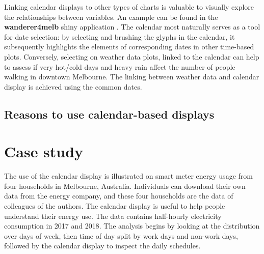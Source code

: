 \documentclass[12pt]{article}
\begin{document}
Linking calendar displays to other types of charts is valuable to
visually explore the relationships between variables. An example can be
found in the \textbf{wanderer4melb} shiny application
\citep{R-wanderer4melb}. The calendar most naturally serves as a tool
for date selection: by selecting and brushing the glyphs in the
calendar, it subsequently highlights the elements of corresponding dates
in other time-based plots. Conversely, selecting on weather data plots,
linked to the calendar can help to assess if very hot/cold days and
heavy rain affect the number of people walking in downtown Melbourne.
The linking between weather data and calendar display is achieved using
the common dates.

\hypertarget{reasons-to-use-calendar-based-displays}{%
\subsection{Reasons to use calendar-based
displays}\label{reasons-to-use-calendar-based-displays}}

\hypertarget{case-study}{%
\section{Case study}\label{case-study}}

\label{sec:case}

The use of the calendar display is illustrated on smart meter energy
usage from four households in Melbourne, Australia. Individuals can
download their own data from the energy company, and these four
households are the data of colleagues of the authors. The calendar
display is useful to help people understand their energy use. The data
contains half-hourly electricity consumption in 2017 and 2018. The
analysis begins by looking at the distribution over days of week, then
time of day split by work days and non-work days, followed by the
calendar display to inspect the daily schedules.
\end{document}
